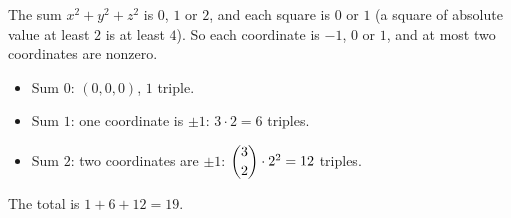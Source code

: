 The sum $x^2+y^2+z^2$ is $0$, $1$ or $2$, and each square is $0$ or $1$ (a square of absolute value at least $2$ is at least $4$). So each coordinate is $-1$, $0$ or $1$, and at most two coordinates are nonzero.
\begin{itemize}
\item Sum $0$: $(0,0,0)$, $1$ triple.
\item Sum $1$: one coordinate is $\pm1$: $3\cdot2=6$ triples.
\item Sum $2$: two coordinates are $\pm1$: $\dbinom{3}{2}\cdot2^2=12$ triples.
\end{itemize}
The total is $1+6+12=\boxed{19}$.
